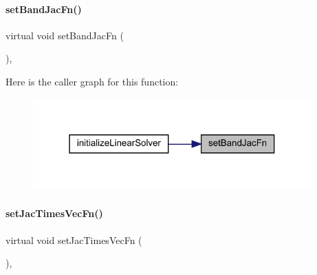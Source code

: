 \mbox{\label{classamici_1_1_solver_a1ac4c2c1cf9df3c478ade2b1d5e728c6}} 
\paragraph{\texorpdfstring{setBandJacFn()}{setBandJacFn()}}
{\footnotesize\ttfamily virtual void set\+Band\+Jac\+Fn (\begin{DoxyParamCaption}{ }\end{DoxyParamCaption})\hspace{0.3cm}{\ttfamily [protected]}, {}}

Here is the caller graph for this function\+:
\nopagebreak
\begin{figure}[H]
\begin{center}
\leavevmode
\includegraphics[width=304pt]{classamici_1_1_solver_a1ac4c2c1cf9df3c478ade2b1d5e728c6_icgraph}
\end{center}
\end{figure}
\mbox{\label{classamici_1_1_solver_a151ebe8ad33f1e635289c869d1412375}} 
\paragraph{\texorpdfstring{setJacTimesVecFn()}{setJacTimesVecFn()}}
{\footnotesize\ttfamily virtual void set\+Jac\+Times\+Vec\+Fn (\begin{DoxyParamCaption}{ }\end{DoxyParamCaption})\hspace{0.3cm}{\ttfamily [protected]}, {}}

\mbox{\label{classamici_1_1_solver_a1081b1ac835a2bf9221552a07d04ef4d}} 
